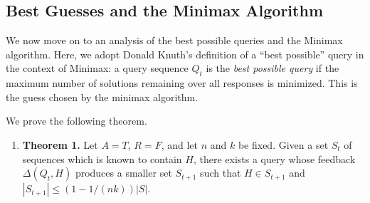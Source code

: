 \documentclass[12pt, a4paper]{article}
\begin{document}
\subsection{Best Guesses and the Minimax Algorithm}
We now move on to an analysis of the best possible queries and the Minimax algorithm. Here, we adopt Donald Knuth's definition of a ``best possible'' query in the context of Minimax\cite{DK76}: a query sequence $Q_t$ is the \textit{best possible query} if the maximum number of solutions remaining over all responses is minimized. This is the guess chosen by the minimax algorithm.

We prove the following theorem.
\begin{enumerate}[label=]
	\item\textbf{Theorem 1.}\label{thm1} Let $A=T$, $R = F$, and let $n$ and $k$ be fixed. Given a set $S_{t}$ of sequences which is known to contain $H$, there exists a query whose feedback $\Delta(Q_t, H)$ produces a smaller set $S_{t+1}$ such that $H\in S_{t+1}$ and $|S_{t+1}|\le (1-1/(nk))|S|$.	
\end{enumerate}
\end{document}
